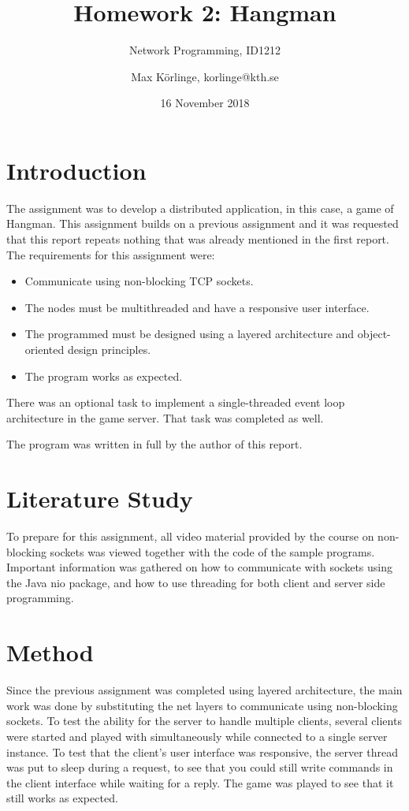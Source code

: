 \documentclass[a4paper]{scrartcl}
\title{Homework 2: Hangman}
\subtitle{Network Programming, ID1212}
\author{Max Körlinge, korlinge@kth.se}
\date{16 November 2018}
\begin{document}
\maketitle


\section{Introduction}

\noindent The assignment was to develop a distributed application, in this case, a game of Hangman. This assignment builds on a previous assignment and it was requested that this report repeats nothing that was already mentioned in the first report. The requirements for this assignment were:

\begin{itemize}
    \item Communicate using non-blocking TCP sockets.
    \item The nodes must be multithreaded and have a responsive user interface.
    \item The programmed must be designed using a layered architecture and object-oriented design principles.
    \item The program works as expected.
\end{itemize}

There was an optional task to implement a single-threaded event loop architecture in the game server. That task was completed as well.

The program was written in full by the author of this report.

\section{Literature Study}

To prepare for this assignment, all video material provided by the course on non-blocking sockets was viewed together with the code of the sample programs. Important information was gathered on how to communicate with sockets using the Java nio package, and how to use threading for both client and server side programming.

\section{Method}

\noindent Since the previous assignment was completed using layered architecture, the main work was done by substituting the net layers to communicate using non-blocking sockets. To test the ability for the server to handle multiple clients, several clients were started and played with simultaneously while connected to a single server instance. To test that the client's user interface was responsive, the server thread was put to sleep during a request, to see that you could still write commands in the client interface while waiting for a reply. The game was played to see that it still works as expected.
\end{document}
